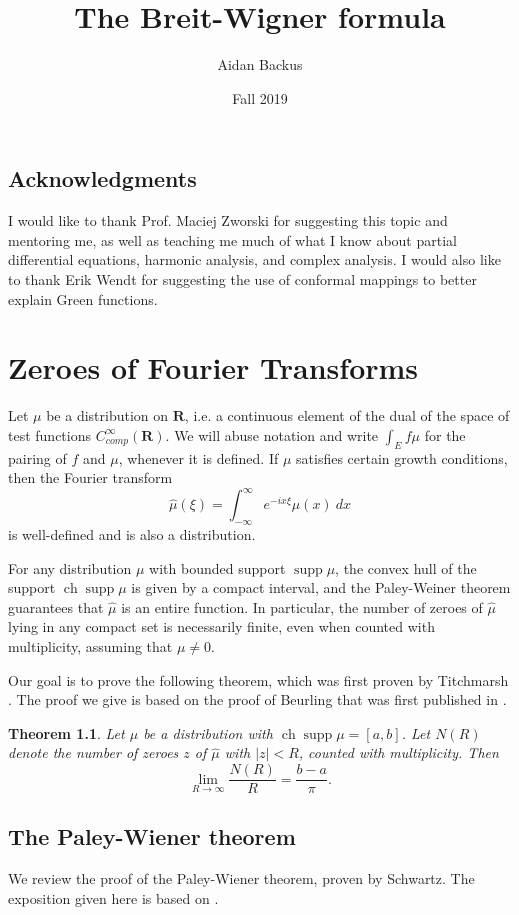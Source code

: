 \documentclass[12pt]{report}
\title{The Breit-Wigner formula}
\author{Aidan Backus}
\date{Fall 2019}
\newcommand{\RR}{\mathbf{R}}
\DeclareMathOperator{\ch}{ch}
\DeclareMathOperator{\supp}{supp}
\newtheorem{theorem}{Theorem}[chapter]
\theoremstyle{definition}
\theoremstyle{remark}
\begin{document}
\maketitle

\tableofcontents


\section*{Acknowledgments}
I would like to thank Prof. Maciej Zworski for suggesting this topic and mentoring me, as well as teaching me much of what I know about partial differential equations, harmonic analysis, and complex analysis. I would also like to thank Erik Wendt for suggesting the use of conformal mappings to better explain Green functions.



\chapter{Zeroes of Fourier Transforms}
Let $\mu$ be a distribution on $\RR$, i.e. a continuous element of the dual of the space of test functions $C^\infty_{comp}(\RR)$. We will abuse notation and write $\int_E f\mu$ for the pairing of $f$ and $\mu$, whenever it is defined. If $\mu$ satisfies certain growth conditions, then the Fourier transform
$$\hat \mu(\xi) = \int_{-\infty}^\infty e^{-ix\xi} \mu(x) ~dx$$
is well-defined and is also a distribution.

For any distribution $\mu$ with bounded support $\supp \mu$, the convex hull of the support $\ch \supp \mu$ is given by a compact interval, and the Paley-Weiner theorem guarantees that $\hat \mu$ is an entire function. In particular, the number of zeroes of $\hat \mu$ lying in any compact set is necessarily finite, even when counted with multiplicity, assuming that $\mu \neq 0$.

Our goal is to prove the following theorem, which was first proven by Titchmarsh \cite{titchmarsh1926zeros}. The proof we give is based on the proof of Beurling that was first published in \cite[Chapter XVI]{hormander2004analysis}.
\begin{theorem}
    Let $\mu$ be a distribution with $\ch \supp \mu = [a, b]$. Let $N(R)$ denote the number of zeroes $z$ of $\hat \mu$ with $|z| < R$, counted with multiplicity. Then
    $$\lim_{R \to \infty} \frac{N(R)}{R} = \frac{b-a}{\pi}.$$
\end{theorem}

\section{The Paley-Wiener theorem}
We review the proof of the Paley-Wiener theorem, proven by Schwartz. The exposition given here is based on \cite[Chapter VII]{hormander2015analysis}.
\end{document}
